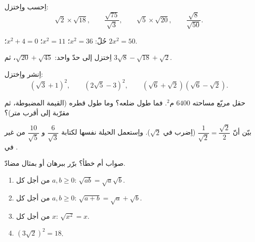 \begin{exercise}[$\star$]\label{exo:g9:sqrt:3}
اِحسب واِختزل:
\[
\sqrt2 \times \sqrt{18}, \qquad
\frac{\sqrt{75}}{\sqrt3}, \qquad
\sqrt5 \times \sqrt{20}, \qquad
\frac{\sqrt{8}}{\sqrt{50}} .
\]
\end{exercise}

\begin{exercise}[$\star$]\label{exo:g9:sqrt:4}
حُلّ: $x^2 = 36$؛ \quad $x^2 = 11$؛ \quad $x^2 + 4 = 0$؛ \quad
$2x^2 = 50$.
\end{exercise}

\begin{exercise}[$\star$]\label{exo:g9:sqrt:5}
اِختزل إلى حدّ واحد: $\sqrt{20} + \sqrt{45}$، ثم
$3\sqrt8 - \sqrt{18} + \sqrt2$.
\end{exercise}

\begin{exercise}[$\star\star$]\label{exo:g9:sqrt:6}
اِنشر واِختزل:
\[
\left(\sqrt3 + 1\right)^2, \qquad
\left(2\sqrt5 - 3\right)^2, \qquad
\left(\sqrt6 + \sqrt2\right)\left(\sqrt6 - \sqrt2\right).
\]
\end{exercise}

\begin{exercise}[$\star\star$]\label{exo:g9:sqrt:7}
حقل مربّع مساحته $6400$ م$^2$. فما طول ضلعه؟ وما طول قطره
(القيمة المضبوطة، ثم مقرّبة إلى أقرب متر)؟
\end{exercise}

\begin{exercise}[$\star\star$]\label{exo:g9:sqrt:8}
بيّن أنّ $\dfrac{1}{\sqrt2} = \dfrac{\sqrt2}{2}$ (اِضرب 
 في $\sqrt2$). واِستعمل الحيلة نفسها لكتابة $\dfrac{6}{\sqrt3}$
و $\dfrac{10}{\sqrt5}$ من غير  في .
\end{exercise}

\begin{exercise}[$\star\star$]\label{exo:g9:sqrt:9}
صواب أم خطأ؟ برّر ببرهان أو بمثال مضادّ.
\begin{enumerate}
  \item من أجل كل $a, b \geq 0$: $\sqrt{ab} = \sqrt a \sqrt b$.
  \item من أجل كل $a, b \geq 0$: $\sqrt{a+b} = \sqrt a + \sqrt b$.
  \item من أجل كل $x$: $\sqrt{x^2} = x$.
  \item $\left(3\sqrt2\right)^2 = 18$.
\end{enumerate}
\end{exercise}

